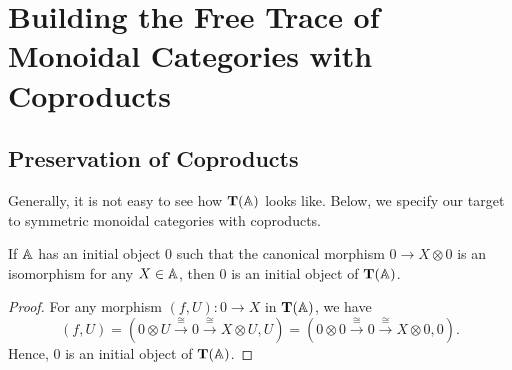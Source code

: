 \section{Building the Free Trace of Monoidal Categories with Coproducts}

\subsection{Preservation of Coproducts}

Generally, it is not easy to see how $\mathbf T(\mathbb{A})$ looks like. Below, we
specify our target to symmetric monoidal categories with coproducts.

\begin{lemma}\label{lem:zero-object}
  If $\mathbb{A}$ has an initial object $0$ such that the canonical morphism
  $0 \to X \otimes 0$ is an isomorphism for any $X \in \mathbb{A}$,
  then $0$ is an initial object of $\mathbf T(\mathbb{A})$.
\end{lemma}
\begin{proof}
  For any morphism $(f,U) \colon 0 \to X$ in $\mathbf T(\mathbb{A})$, we have
  \begin{equation*}
    (f,U) = (0 \otimes U \xrightarrow{\cong}  0 \xrightarrow{\cong} X \otimes U,U)
    = (0 \otimes 0 \xrightarrow{\cong}  0 \xrightarrow{\cong} X \otimes 0,0).
  \end{equation*}
  Hence, $0$ is an initial object of $\mathbf T(\mathbb{A})$.
\end{proof}

